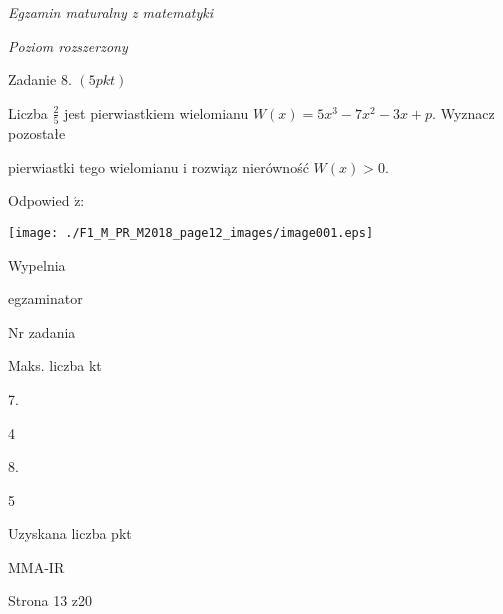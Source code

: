 \documentclass[a4paper,12pt]{article}
\begin{document}
{\it Egzamin maturalny z matematyki}

{\it Poziom rozszerzony}

Zadanie 8. $(5pkt)$

Liczba $\displaystyle \frac{2}{5}$ jest pierwiastkiem wielomianu $W(x)=5x^{3}-7x^{2}-3x+p$. Wyznacz pozostałe

pierwiastki tego wielomianu i rozwiąz nierówność $W(x)>0.$

Odpowied $\acute{\mathrm{z}}$:
\begin{center}
\texttt{[image: ./F1\_M\_PR\_M2018\_page12\_images/image001.eps]}
\end{center}
Wypelnia

egzaminator

Nr zadania

Maks. liczba kt

7.

4

8.

5

Uzyskana liczba pkt

MMA-IR

Strona 13 z20
\end{document}
